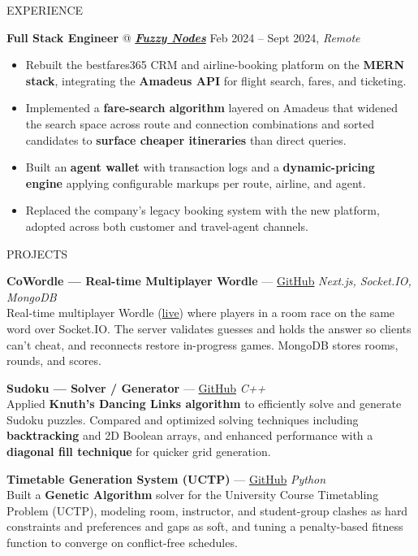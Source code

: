 \documentclass{resume} %
\makeatletter
\newcommand{\experience}[5]{
    \textbf{#1} @ \textit{\textbf{#2}} \hfill #3, \textit{#4}
    \vspace{-7pt}
    \begin{itemize}[leftmargin=*]
        \itemsep -7pt {}
        #5
    \end{itemize}
    \vspace{-4pt}
}
\newcommand{\project}[4]{
    \item \textbf{#1} --- \href{#2}{GitHub} \hfill \textit{#3}\\
    #4
    \vspace{-5pt}
}
\makeatother
\begin{document}
\begin{rSection}{EXPERIENCE}
\experience{Full Stack Engineer}{\href{https://bestfares365.com.au}{Fuzzy Nodes}}{Feb 2024 -- Sept 2024}{Remote}{
    \item Rebuilt the bestfares365 CRM and airline-booking platform on the \textbf{MERN stack}, integrating the \textbf{Amadeus API} for flight search, fares, and ticketing.
    \item Implemented a \textbf{fare-search algorithm} layered on Amadeus that widened the search space across route and connection combinations and sorted candidates to \textbf{surface cheaper itineraries} than direct queries.
    \item Built an \textbf{agent wallet} with transaction logs and a \textbf{dynamic-pricing engine} applying configurable markups per route, airline, and agent.
    \item Replaced the company's legacy booking system with the new platform, adopted across both customer and travel-agent channels.
}

\end{rSection}

\vspace{-1pt}
\begin{rSection}{PROJECTS}
\vspace{-12pt}

\project{CoWordle --- Real-time Multiplayer Wordle}{https://github.com/MubashirTanwar/CoWordle}{Next.js, Socket.IO, MongoDB}{
    Real-time multiplayer Wordle (\href{https://co-wordle.vercel.app/}{live}) where players in a room race on the same word over Socket.IO. The server validates guesses and holds the answer so clients can't cheat, and reconnects restore in-progress games. MongoDB stores rooms, rounds, and scores.
}
\project{Sudoku --- Solver / Generator}{https://github.com/MubashirTanwar/Sudoku}{C++}{ %
    Applied \textbf{Knuth's Dancing Links algorithm} to efficiently solve and generate Sudoku puzzles. Compared and optimized solving techniques including \textbf{backtracking} and 2D Boolean arrays, and enhanced performance with a \textbf{diagonal fill technique} for quicker grid generation.
}
\project{Timetable Generation System (UCTP)}{https://github.com/MubashirTanwar/Timetable}{Python}{ %
    Built a \textbf{Genetic Algorithm} solver for the University Course Timetabling Problem (UCTP), modeling room, instructor, and student-group clashes as hard constraints and preferences and gaps as soft, and tuning a penalty-based fitness function to converge on conflict-free schedules.
}


\end{rSection}
\end{document}
